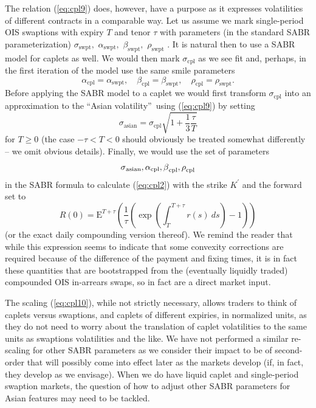 \documentclass{article}
\begin{document}
The relation (\ref{eq:cpl9}) does, however, have a purpose as it expresses
volatilities of different contracts in a comparable way. Let us assume we
mark single-period OIS swaptions with expiry $T$ and tenor $\tau $ with
parameters (in the standard SABR parameterization) $\sigma _{\mathrm{swpt}},$
$\alpha _{\mathrm{swpt}},$ $\beta _{\mathrm{swpt}},$ $\rho _{\mathrm{swpt}}$%
. It is natural then to use a SABR model for caplets as well. We would then
mark $\sigma _{\mathrm{cpl}}$ as we see fit and, perhaps, in the first
iteration of the model use the same smile parameters 
\begin{equation*}
\alpha _{\mathrm{cpl}}=\alpha _{\mathrm{swpt}},\quad \beta _{\mathrm{cpl}%
}=\beta _{\mathrm{swpt}},\quad \rho _{\mathrm{cpl}}=\rho _{\mathrm{swpt}}.
\end{equation*}%
Before applying the SABR model to a caplet we would first transform $\sigma
_{\mathrm{cpl}}$ into an approximation to the \textquotedblleft Asian
volatility\textquotedblright\ using (\ref{eq:cpl9}) by setting%
\begin{equation}
\sigma _{\mathrm{asian}}=\sigma _{\mathrm{cpl}}\sqrt{1+\frac{1}{3}\frac{\tau 
}{T}}  \label{eq:cpl10}
\end{equation}%
for $T\geq 0$ (the case $-\tau <T<0$ should obviously be treated somewhat
differently -- we omit obvious details). Finally, we would use the set of
parameters 
\begin{equation*}
\sigma _{\mathrm{asian}},\alpha _{\mathrm{cpl}},\beta _{\mathrm{cpl}},\rho _{%
\mathrm{cpl}}
\end{equation*}%
in the SABR formula to calculate (\ref{eq:cpl2}) with the strike $K^{\prime }
$ and the forward set to 
\begin{equation*}
R(0)=\mathrm{E}^{T+\tau }\left( \frac{1}{\tau }\left( \exp \left(
\int_{T}^{T+\tau }r(s)~ds\right) -1\right) \right) 
\end{equation*}%
(or the exact daily compounding version thereof). We remind the reader that
while this expression seems to indicate that some convexity corrections are
required because of the difference of the payment and fixing times, it is in
fact these quantities that are bootstrapped from the (eventually liquidly
traded) compounded OIS in-arrears swaps, so in fact are a direct market
input.

The scaling (\ref{eq:cpl10}), while not strictly necessary, allows traders
to think of caplets versus swaptions, and caplets of different expiries, in
normalized units, as they do not need to worry about the translation of
caplet volatilities to the same units as swaptions volatilities and the
like. We have not performed a similar re-scaling for other SABR parameters
as we consider their impact to be of second-order that will possibly come
into effect later as the markets develop (if, in fact, they develop as we
envisage). When we do have liquid caplet and single-period swaption markets,
the question of how to adjust other SABR parameters for Asian features may
need to be tackled.
\end{document}
